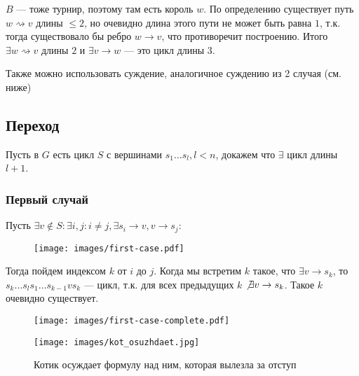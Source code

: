 $B$ --- тоже турнир, поэтому там есть король $w$. По определению существует путь $w\rightsquigarrow v$ длины $\le 2$, но очевидно длина этого пути не может быть равна $1$, т.к. тогда существовало бы ребро $w\to v$, что противоречит построению. Итого $\exists w\rightsquigarrow v$ длины $2$ и $\exists v\to w$ --- это цикл длины 3.

Также можно использовать суждение, аналогичное суждению из 2 случая (см. ниже)

\subsection*{Переход}

Пусть в $G$ есть цикл $S$ с вершинами $s_1\ldots s_l, l<n$, докажем что $\exists$ цикл длины $l+1$.

\subsubsection*{Первый случай}

Пусть $\exists v\not\in S : \exists i, j : i\not=j, \exists s_i\to v, v\to s_j$:

\begin{figure}[h]
    \texttt{[image: images/first-case.pdf]}
    \centering
\end{figure}

Тогда пойдем индексом $k$ от $i$ до $j$. Когда мы встретим $k$ такое, что $\exists v\to s_k$, то
$s_k\ldots s_ls_1\ldots s_{k-1}v s_k$ --- цикл, т.к. для всех предыдущих $k$ $\not\exists v\to s_k$. Такое $k$ очевидно существует.

\begin{minipage}{\linewidth}
    \centering
    \begin{minipage}{0.6\linewidth}
        \begin{figure}[H]
            \texttt{[image: images/first-case-complete.pdf]}
            \centering
        \end{figure}
    \end{minipage}
    \hspace{0.05\linewidth}
    \begin{minipage}{0.27\linewidth}
        \begin{figure}[H]
            \begin{flushright}
                \texttt{[image: images/kot\_osuzhdaet.jpg]}
                \caption{Котик осуждает формулу над ним, которая вылезла за отступ}
            \end{flushright}
        \end{figure}
    \end{minipage}
\end{minipage}

